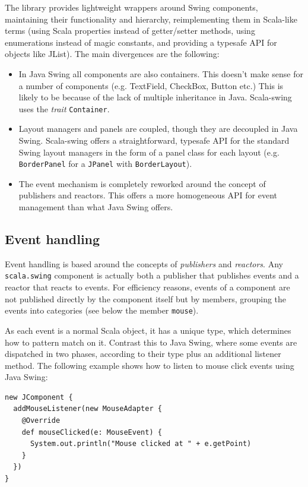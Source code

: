 The library provides lightweight wrappers around Swing components, maintaining their functionality and hierarchy, reimplementing them in Scala-like terms (using Scala properties instead of getter/setter methods, using enumerations instead of magic constants, and providing a typesafe API for objects like JList). The main divergences are the following:
\begin{itemize}
\item In Java Swing all components are also containers. This doesn't make sense for a number of components (e.g. TextField, CheckBox, Button etc.) This is likely to be because of the lack of multiple inheritance in Java. Scala-swing uses the \emph{trait} \texttt{Container}.

\item Layout managers and panels are coupled, though they are decoupled in Java Swing. Scala-swing offers a straightforward, typesafe API for the standard Swing layout managers in the form of a panel class for each layout (e.g. \texttt{BorderPanel} for a \texttt{JPanel} with \texttt{BorderLayout}).

\item The event mechanism is completely reworked around the concept of publishers and reactors. This offers a more homogeneous API for event management than what Java Swing offers.
\end{itemize}

\subsection{Event handling}\label{sec:theory_scala-swing-event-handling}

Event handling is based around the concepts of \emph{publishers} and \emph{reactors}. Any \texttt{scala.\-swing} component is actually both a publisher that publishes events and a reactor that reacts to events. For efficiency reasons, events of a component are not published directly by the component itself but by members, grouping the events into categories (see below the member \texttt{mouse}).

As each event is a normal Scala object, it has a unique type, which determines how to pattern match on it. Contrast this to Java Swing, where some events are dispatched in two phases, according to their type plus an additional listener method. The following example shows how to listen to mouse click events using Java Swing:
\begin{lstlisting}
new JComponent {
  addMouseListener(new MouseAdapter {
    @Override
    def mouseClicked(e: MouseEvent) {
      System.out.println("Mouse clicked at " + e.getPoint)
    }
  })
}
\end{lstlisting}

